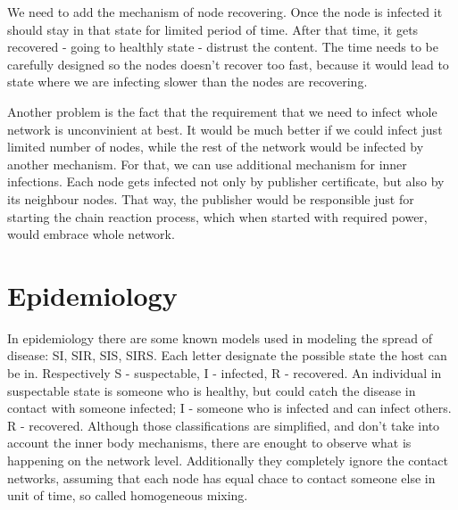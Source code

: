 \documentclass[nostrict]{szablonPG}
\begin{document}
We need to add the mechanism of node recovering. Once the node is infected it should stay in that state for limited period of time. After that time, it gets recovered - going to healthly state - distrust the content. The time needs to be carefully designed so the nodes doesn't recover too fast, because it would lead to state where we are infecting slower than the nodes are recovering. 

Another problem is the fact that the requirement that we need to infect whole network is unconvinient at best. It would be much better if we could infect just limited number of nodes, while the rest of the network would be infected by another mechanism.
For that, we can use additional mechanism for inner infections. Each node gets infected not only by publisher certificate, but also by its neighbour nodes. That way, the publisher would be responsible just for starting the chain reaction process, which when started with required power, would embrace whole network. 

\section{Epidemiology}
In epidemiology there are some known models used in modeling the spread of disease: SI, SIR, SIS, SIRS. Each letter designate the possible state the host can be in. Respectively S - suspectable, I - infected, R - recovered. An individual in suspectable state is someone who is healthy, but could catch the disease in contact with someone infected; I - someone who is infected and can infect others. R - recovered. Although those classifications are simplified, and don't take into account the inner body mechanisms, there are enought to observe what is happening on the network level. Additionally they completely ignore the contact networks, assuming that each node has equal chace to contact someone else in unit of time, so called homogeneous mixing.
\end{document}
